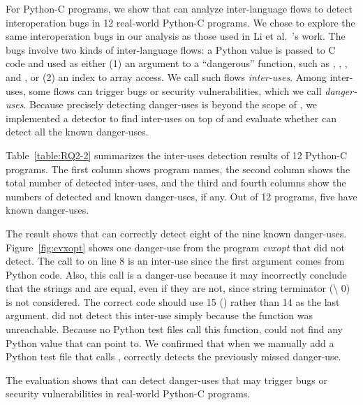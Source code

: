 For Python-C programs, we show that \ours can analyze inter-language flows to
detect interoperation bugs in 12 real-world Python-C programs.  We chose to
explore the same interoperation bugs in our analysis as those used in Li et
al.~\cite{polycruise}'s work.  The bugs involve two kinds of inter-language
flows: a Python value is passed to C code and used as either (1) an argument to
a ``dangerous'' function, such as , ,
, and , or (2) an index to array access.  We call
such flows \textit{inter-uses}.  Among inter-uses, some flows can trigger bugs
or security vulnerabilities, which we call \textit{danger-uses}.  Because
precisely detecting danger-uses is beyond the scope of \ours, we implemented a
detector to find inter-uses on top of \ours and evaluate whether \ours can
detect all the known danger-uses.

Table~\ref{table:RQ2-2} summarizes the inter-uses detection results of 12
Python-C programs.  The first column shows program names, the second column
shows the total number of detected inter-uses, and the third and fourth columns
show the numbers of detected and known danger-uses, if any.  Out of 12
programs, five have known danger-uses.

The result shows that \ours can correctly detect eight of the nine known
danger-uses.  Figure~\ref{fig:cvxopt} shows one danger-use from the program
{\it cvxopt} that \ours did not detect.  The call to  on line
8 is an inter-use since the first argument  comes from Python
code.  Also, this call is a danger-use because it may incorrectly conclude that
the strings  and  are equal, even if they
are not, since string terminator (\textquotesingle \textbackslash
0\textquotesingle) is not considered.  The correct code should use 15
() rather than 14 as the last argument.
\ours did not detect this inter-use simply because the function
 was unreachable.  Because no Python test files call this
function, \ours could not find any Python value that  can point
to. We confirmed that when we manually add a Python test file that calls
, \ours correctly detects the previously missed danger-use.

The evaluation shows that \ours can detect danger-uses that may
trigger bugs or security vulnerabilities in real-world Python-C programs.
